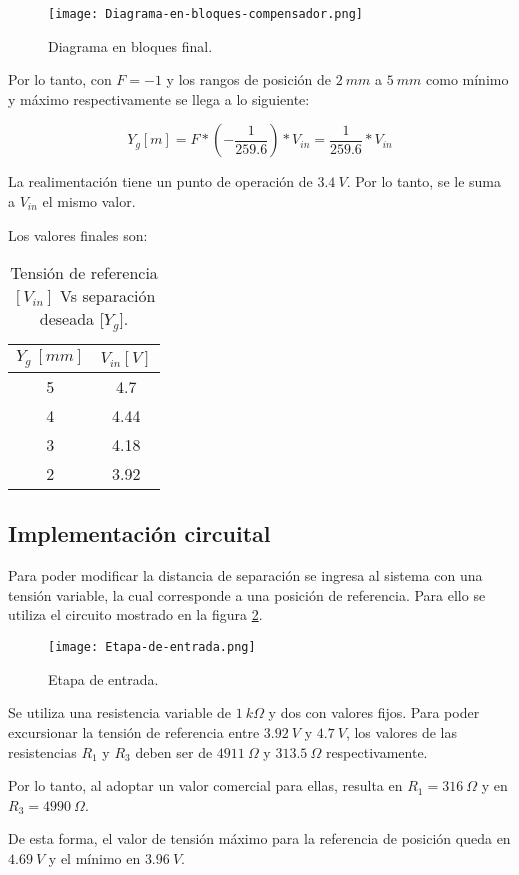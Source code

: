 \begin{figure}[H]
	\centering
	\texttt{[image: Diagrama-en-bloques-compensador.png]}
	\caption{Diagrama en bloques final.}
	\label{fig:diag-bloques-compensador}
\end{figure}

\noindent Por lo tanto, con $F=-1$ y los rangos de posición de $2\:mm$ a $5\:mm$ como mínimo y máximo respectivamente se llega a lo siguiente:

\begin{equation} 
	Y_g[m] = F * (-\frac{1}{259.6})*V_{in} =\frac{1}{259.6}*V_{in} 
\end{equation}

\noindent La realimentación tiene un punto de operación de $3.4\:V$. Por lo tanto, se le suma a $V_{in}$ el mismo valor.

\noindent Los valores finales son:


\begin{table}[H]
	\begin{center}
		\begin{tabular}{| c | c |}
			\hline
			$Y_g\:[mm]$ & $V_{in}[V]$\\ \hline
			5 & 4.7\\ \hline
			4 & 4.44 \\ \hline
			3 & 4.18\\ \hline
			2 &	3.92 \\ \hline		
		\end{tabular}
		\caption{Tensión de referencia $[V_{in}]$ Vs separación deseada [$Y_g$].}
		\label{tension-ref-vs-separacion-deseada}
	\end{center}
\end{table}

\subsection{Implementación circuital}

\noindent Para poder modificar la distancia de separación se ingresa al sistema con una tensión variable, la cual corresponde a una posición de referencia. Para ello se utiliza el circuito mostrado en la figura \ref{fig:etapa-de-entrada}.

\begin{figure}[H]
	\centering
	\texttt{[image: Etapa-de-entrada.png]}
	\caption{ Etapa de entrada.}
	\label{fig:etapa-de-entrada}
\end{figure}

 
 \noindent Se utiliza una resistencia variable de $1\:k\Omega$ y dos con valores fijos. Para poder excursionar la tensión de referencia entre $3.92\:V$ y $4.7\:V$, los valores de las resistencias $R_1$ y $R_3$ deben ser de $4911\:\Omega$ y $313.5\:\Omega$ respectivamente. 
 
\noindent Por lo tanto, al adoptar un valor comercial para ellas, resulta en $R_1 = 316 \:\Omega$ y en $R_3 = 4990 \:\Omega$.
 
\noindent De esta forma, el valor de tensión máximo para la referencia de posición queda en $4.69\:V$ y el mínimo en $3.96\:V$.
 
